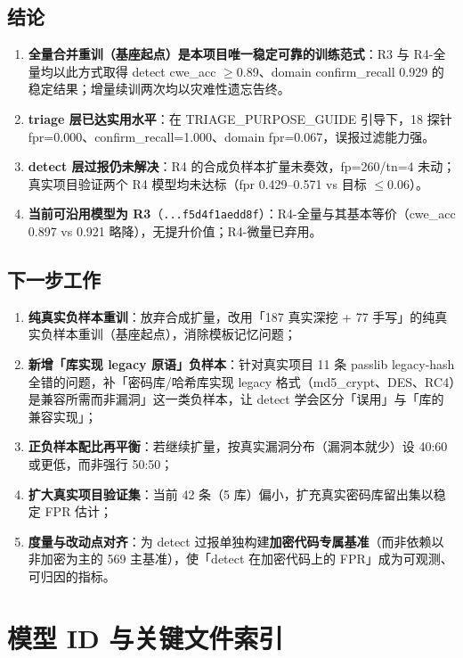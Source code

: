 \documentclass[UTF8,11pt]{ctexart}
\begin{document}
\subsection{结论}

\begin{enumerate}
  \item \textbf{全量合并重训（基座起点）是本项目唯一稳定可靠的训练范式}：R3 与 R4-全量均以此方式取得 detect cwe\_acc $\geq$0.89、domain confirm\_recall 0.929 的稳定结果；增量续训两次均以灾难性遗忘告终。
  \item \textbf{triage 层已达实用水平}：在 TRIAGE\_PURPOSE\_GUIDE 引导下，18 探针 fpr=0.000、confirm\_recall=1.000、domain fpr=0.067，误报过滤能力强。
  \item \textbf{detect 层过报仍未解决}：R4 的合成负样本扩量未奏效，fp=260/tn=4 未动；真实项目验证两个 R4 模型均未达标（fpr 0.429--0.571 vs 目标 $\leq$0.06）。
  \item \textbf{当前可沿用模型为 R3}（\texttt{...f5d4f1aedd8f}）：R4-全量与其基本等价（cwe\_acc 0.897 vs 0.921 略降），无提升价值；R4-微量已弃用。
\end{enumerate}

\subsection{下一步工作}

\begin{enumerate}
  \item \textbf{纯真实负样本重训}：放弃合成扩量，改用「187 真实深挖 + 77 手写」的纯真实负样本重训（基座起点），消除模板记忆问题；
  \item \textbf{新增「库实现 legacy 原语」负样本}：针对真实项目 11 条 passlib legacy-hash 全错的问题，补「密码库/哈希库实现 legacy 格式（md5\_crypt、DES、RC4）是兼容所需而非漏洞」这一类负样本，让 detect 学会区分「误用」与「库的兼容实现」；
  \item \textbf{正负样本配比再平衡}：若继续扩量，按真实漏洞分布（漏洞本就少）设 40:60 或更低，而非强行 50:50；
  \item \textbf{扩大真实项目验证集}：当前 42 条（5 库）偏小，扩充真实密码库留出集以稳定 FPR 估计；
  \item \textbf{度量与改动点对齐}：为 detect 过报单独构建\textbf{加密代码专属基准}（而非依赖以非加密为主的 569 主基准），使「detect 在加密代码上的 FPR」成为可观测、可归因的指标。
\end{enumerate}

\appendix
\section{模型 ID 与关键文件索引}
\end{document}
